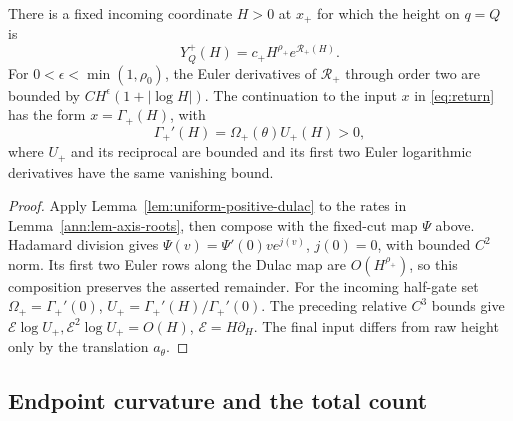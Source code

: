 \begin{lemma}\label{ann:lem-positive-dulac}
There is a fixed incoming coordinate \(H>0\) at \(x_+\) for which
the height on \(q=Q\) is
\begin{equation}\label{ann:positive-dulac-map}
 Y_Q^+(H)=c_+H^{\rho_+}e^{\mathcal R_+(H)}.
\end{equation}
For \(0<\epsilon<\min(1,\rho_0)\), the Euler derivatives of
\(\mathcal R_+\) through order two are bounded by
\(CH^\epsilon(1+|\log H|)\).
The continuation to the input \(x\) in \eqref{eq:return}
has the form \(x=\Gamma_+(H)\), with
\begin{equation}\label{ann:positive-gate-derivative}
 \Gamma_+'(H)=\Omega_+(\theta)U_+(H)>0,
\end{equation}
where \(U_+\) and its reciprocal are bounded and its first two
Euler logarithmic derivatives have the same vanishing bound.
\end{lemma}
\begin{proof}
Apply Lemma~\ref{lem:uniform-positive-dulac} to the rates in
Lemma~\ref{ann:lem-axis-roots}, then compose with the fixed-cut map
\(\Psi\) above. Hadamard division gives
\(\Psi(v)=\Psi'(0)ve^{j(v)}\), \(j(0)=0\), with bounded \(C^2\)
norm. Its first two Euler rows along the Dulac map are
\(O(H^{\rho_+})\), so this composition preserves the asserted remainder.
For the incoming half-gate set
\(\Omega_+=\Gamma_+'(0)\), \(U_+=\Gamma_+'(H)/\Gamma_+'(0)\).
The preceding relative \(C^3\) bounds give
\(\mathcal E\log U_+,\mathcal E^2\log U_+=O(H)\),
\(\mathcal E=H\partial_H\). The final input differs from raw height
only by the translation \(a_\theta\).
\end{proof}

\subsection{Endpoint curvature and the total count}

